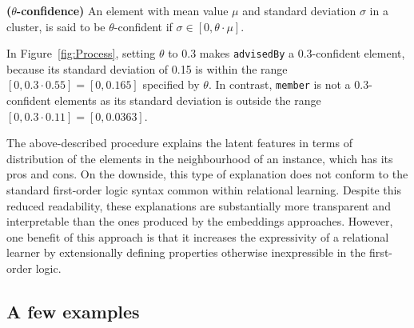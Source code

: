 \begin{definition}{\textbf{($\theta$-confidence)}}
An element with mean value $\mu$ and standard deviation $\sigma$  in a cluster,  is said to be $\theta$-confident if $\sigma \in [0, \theta \cdot \mu]$.
\end{definition}

In Figure~\ref{fig:Process}, setting $\theta$ to 0.3 makes \texttt{advisedBy} a $0.3$-confident element, because its standard deviation of 0.15 is within the range $[0, 0.3 \cdot 0.55] = [0, 0.165]$ specified by $\theta$.
In contrast, \texttt{member} is not a $0.3$-confident elements as its standard deviation is outside the range $[0, 0.3 \cdot 0.11] = [0, 0.0363]$.


The above-described procedure explains the latent features in terms of distribution of the elements in the neighbourhood of an instance, which has its pros and cons.
On the downside, this type of explanation does not conform to the standard first-order logic syntax common within relational learning.
Despite this reduced readability, these explanations are substantially more transparent and interpretable than the ones produced by the embeddings approaches.
However, one benefit of this approach is that it increases the expressivity of a relational learner by extensionally defining  properties otherwise inexpressible in the first-order logic.


\subsection{A few examples}








